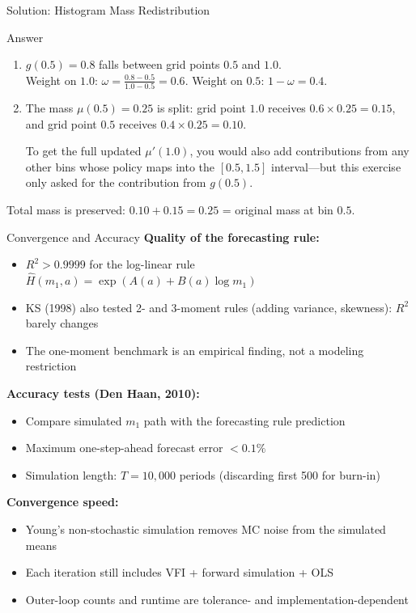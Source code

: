\documentclass[aspectratio=169,11pt]{beamer}
\newcommand{\emphc}[1]{\textcolor{harvardcrimson}{#1}}
\begin{document}
\begin{frame}{Solution: Histogram Mass Redistribution}
\begin{block}{Answer}
\begin{enumerate}
    \item $g(0.5) = 0.8$ falls between grid points $0.5$ and $1.0$.\\
    Weight on $1.0$: $\omega = \frac{0.8 - 0.5}{1.0 - 0.5} = 0.6$. \quad Weight on $0.5$: $1 - \omega = 0.4$.
    \item The mass $\mu(0.5) = 0.25$ is split: grid point $1.0$ receives $0.6 \times 0.25 = 0.15$, and grid point $0.5$ receives $0.4 \times 0.25 = 0.10$.

    To get the full updated $\mu'(1.0)$, you would also add contributions from any other bins whose policy maps into the $[0.5, 1.5]$ interval---but this exercise only asked for the contribution from $g(0.5)$.
\end{enumerate}
Total mass is preserved: $0.10 + 0.15 = 0.25$ = original mass at bin $0.5$. \checkmark
\end{block}
\end{frame}

\begin{frame}{Convergence and Accuracy}
\textbf{Quality of the forecasting rule:}
\begin{itemize}
    \item $R^2 > 0.9999$ for the log-linear rule $\hat{H}(m_1, a) = \exp(A(a) + B(a) \log m_1)$
    \item KS (1998) also tested 2- and 3-moment rules (adding variance, skewness): $R^2$ barely changes
    \item The one-moment benchmark is an \emphc{empirical finding}, not a modeling restriction
\end{itemize}

\vspace{0.5em}
\textbf{Accuracy tests (Den Haan, 2010):}
\begin{itemize}
    \item Compare simulated $m_1$ path with the forecasting rule prediction
    \item Maximum one-step-ahead forecast error $< 0.1\%$
    \item Simulation length: $T = 10{,}000$ periods (discarding first 500 for burn-in)
\end{itemize}

\vspace{0.5em}
\textbf{Convergence speed:}
\begin{itemize}
    \item Young's non-stochastic simulation removes MC noise from the simulated means
    \item Each iteration still includes VFI + forward simulation + OLS
    \item Outer-loop counts and runtime are tolerance- and implementation-dependent
\end{itemize}
\end{frame}
\end{document}
